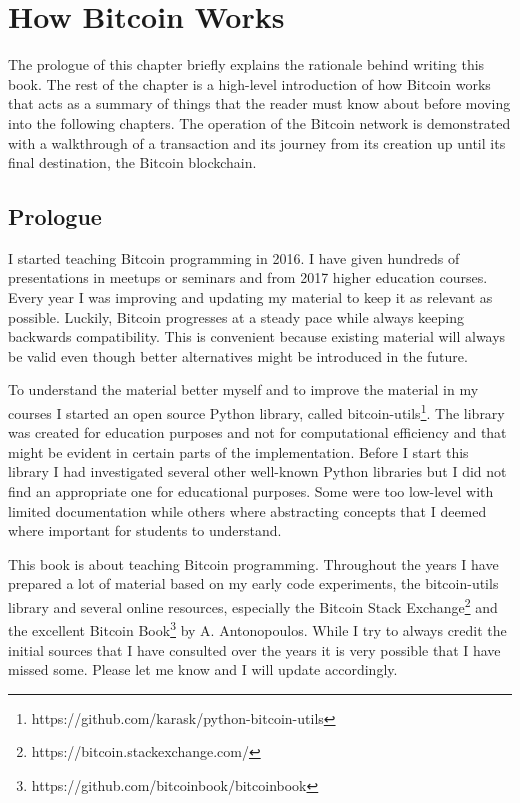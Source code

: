 \chapter{How Bitcoin Works}

\begin{summary}
The prologue of this chapter briefly explains the rationale behind writing this book. The rest of the chapter is a high-level introduction of how Bitcoin works that acts as a summary of things that the reader must know about before moving into the following chapters. The operation of the Bitcoin network is demonstrated with a walkthrough of a transaction and its journey from its creation up until its final destination, the Bitcoin blockchain.
\end{summary}

\section{Prologue}
I started teaching Bitcoin programming in 2016. I have given hundreds of presentations in meetups or seminars and from 2017 higher education courses. Every year I was improving and updating my material to keep it as relevant as possible. Luckily, Bitcoin progresses at a steady pace while always keeping backwards compatibility. This is convenient because existing material will always be valid even though better alternatives might be introduced in the future.
  
To understand the material better myself and to improve the material in my courses I started an open source Python library, called bitcoin-utils\footnote{https://github.com/karask/python-bitcoin-utils}. The library was created for education purposes and not for computational efficiency and that might be evident in certain parts of the implementation. Before I start this library I had investigated several other well-known Python libraries but I did not find an appropriate one for educational purposes. Some were too low-level with limited documentation while others where abstracting concepts that I deemed where important for students to understand.

This book is about teaching Bitcoin programming. Throughout the years I have prepared a lot of material based on my early code experiments, the bitcoin-utils library and several online resources, especially the Bitcoin Stack Exchange\footnote{https://bitcoin.stackexchange.com/} and the excellent Bitcoin Book\footnote{https://github.com/bitcoinbook/bitcoinbook} by A. Antonopoulos. While I try to always credit the initial sources that I have consulted over the years it is very possible that I have missed some. Please let me know and I will update accordingly.

